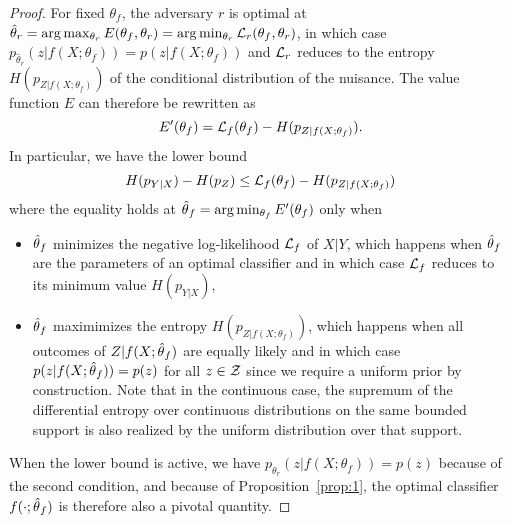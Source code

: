 \documentclass[twocolumn,superscriptaddress,aps]{revtex4-1}
\theoremstyle{plain}
\begin{document}
\begin{proof}

For fixed $\theta_f$, the adversary $r$ is optimal at $\hat\theta_r = \arg
\max_{\theta_r} E(\theta_f, \theta_r)  = \arg \min_{\theta_r} {\cal
L}_r(\theta_f, \theta_r)$, in which case $p_{\hat\theta_r}(z|f(X;\theta_f)) =
p(z|f(X;\theta_f))$ and ${\cal L}_r$ reduces to the entropy
$H(p_{Z|f(X;\theta_f)})$ of the conditional distribution of the nuisance. The
value function $E$ can therefore be rewritten as $$E'(\theta_f) = {\cal
L}_f(\theta_f) - H(p_{Z|f(X;\theta_f)}).$$  In particular, we have the lower
bound $$H(p_{Y|X}) - H(p_Z) \leq {\cal L}_f(\theta_f) - H(p_{Z|f(X;\theta_f)})$$
where the equality holds at $\smash{\hat\theta}_f = \arg \min_{\theta_f}
E'(\theta_f)$ only when
\begin{itemize}
    \item $\smash{\hat\theta}_f$ minimizes the negative log-likelihood ${\cal
    L}_f$ of $X|Y$, which happens when $\smash{\hat\theta}_f$ are the parameters
    of an optimal classifier and in which case ${\cal L}_f$ reduces to its
    minimum value $H(p_{Y|X})$,

    \item $\smash{\hat\theta}_f$ maximimizes the entropy
    $H(p_{Z|f(X;\theta_f)})$, which happens when all outcomes of
    $Z|f(X;\smash{\hat\theta}_f)$ are equally likely and in which case
    $p(z|f(X;\smash{\hat\theta}_f)) = p(z)$ for all $z \in {\cal Z}$ since we
    require a uniform prior by construction. Note that in the continuous case,
    the supremum of the differential entropy over continuous distributions on
    the same bounded support is also realized by the uniform distribution over
    that support.
\end{itemize}
When the lower bound is active, we have $p_{\theta_r}(z|f(X;\theta_f)) = p(z)$
because of the second condition, and because of Proposition~\ref{prop:1}, the
optimal classifier $f(\cdot;\smash{\hat\theta}_f)$ is therefore also a pivotal
quantity.

\end{proof}
\end{document}
